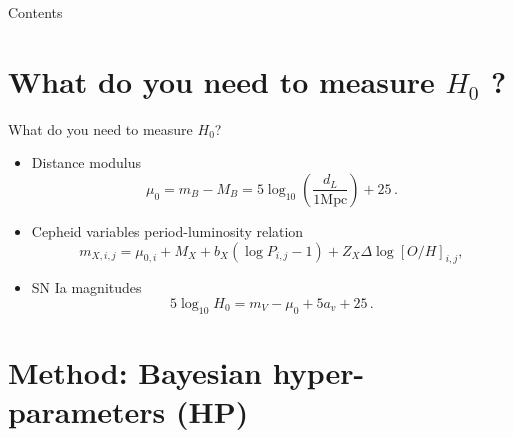 \documentclass{beamer}
\begin{document}
\begin{frame}
  \titlepage
\end{frame}

\begin{frame}{Contents}
  \tableofcontents
\end{frame}

\section{What do you need to measure $H_0$ ?}

\begin{frame}{What do you need to measure $H_0$?}
\begin{itemize}
\item Distance modulus 
\begin{equation*}
\mu_0 = m_B - M_B = 5 \log_{10} \left(\frac{d_L}{1 \mathrm{Mpc}} \right) + 25 \, . \label{eq:distmag}
\end{equation*}
\item Cepheid variables period-luminosity relation
\begin{equation*}\label{Eq:P-L-equation}
m_{X,i,j} = \mu_{0,i} + M_X + b_X (\log P_{i,j}-1) + Z_X \Delta \log[O/H]_{i,j},
\end{equation*}
\item SN Ia magnitudes
\begin{equation*}
5 \log_{10} H_0 = m_V - \mu_0 + 5a_v + 25 \, . \label{eq:h0formalism}
\end{equation*}
\end{itemize}
\end{frame}

\section{Method: Bayesian hyper-parameters (HP)}
\end{document}
